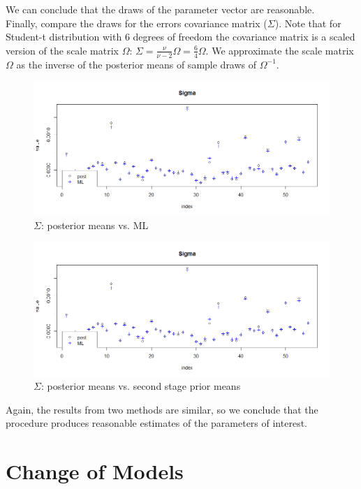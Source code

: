 \documentclass[12pt]{article}
\begin{document}
We can conclude that the draws of the parameter vector are reasonable. \\
Finally, compare the draws for the errors covariance matrix ($\Sigma$). Note that for Student-t distribution with 6 degrees of freedom the covariance matrix is a scaled version of the scale matrix $\Omega$: $\Sigma = \frac{\nu}{\nu - 2}\Omega = \frac{6}{4}\Omega$. We approximate the scale matrix $\Omega$ as the inverse of the posterior means of sample draws of $\Omega^{-1}$. 
\begin{figure}[!h]
	\centering
	\includegraphics[width=15cm]{Pics/PlotSigmaPostML.png}
	\caption{$\Sigma$: posterior means vs. ML}
\end{figure}
\begin{figure}[!h]
	\centering
	\includegraphics[width=15cm]{Pics/PlotSigmaPostML.png}
	\caption{$\Sigma$: posterior means vs. second stage prior means}
\end{figure}
Again, the results from two methods are similar, so we conclude that the procedure produces reasonable estimates of the parameters of interest.
\section{Change of Models}
\end{document}
